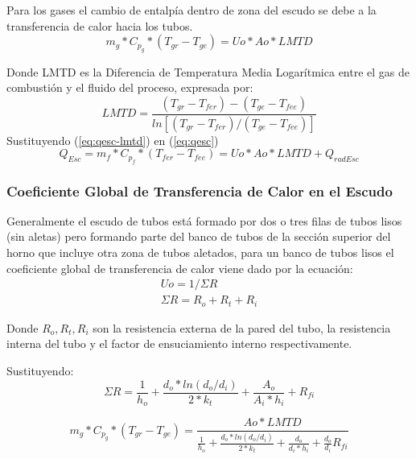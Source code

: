 \par Para los gases el cambio de entalpía dentro de zona del escudo se debe a la transferencia de calor hacia los tubos.
\begin{equation}
\label{eq:qesc-lmtd}
m_{g} *C_{p_g} *(T_{gr} -T_{ge}) = Uo *Ao *LMTD
\end{equation}

\par Donde LMTD es la Diferencia de Temperatura Media Logarítmica entre el gas de combustión y el fluido del proceso, expresada por:
\begin{equation}
\label{eq:lmtd}
   LMTD = \frac{(T_{gr}-T_{fer}) - (T_{ge}-T_{fee})}
   {ln[(T_{gr}-T_{fer}) /(T_{ge}-T_{fee})]}
\end{equation}
Sustituyendo (\ref{eq:qesc-lmtd}) en (\ref{eq:qesc})
\begin{equation}
\label{eq:tesc}
  Q_{Esc} = m_{f} *C_{p_f} *(T_{fer} - T_{fee}) = Uo *Ao *LMTD + Q_{radEsc}
\end{equation}

\subsubsection{Coeficiente Global de Transferencia de Calor en el Escudo}

\par Generalmente el escudo de tubos está formado por dos o tres filas de tubos lisos (sin aletas) pero formando parte del banco de tubos de la sección superior del horno que incluye otra zona de tubos aletados, para un banco de tubos lisos el coeficiente global de transferencia de calor viene dado por la ecuación:
\begin{gather*}
\label{}
Uo  = 1 / \Sigma R \\
\Sigma R = R_o + R_t + R_i
\end{gather*}

\par Donde $R_o, R_t, R_i$ son la resistencia externa de la pared del tubo, la resistencia interna del tubo y el factor de ensuciamiento interno respectivamente.
\par Sustituyendo:
\begin{equation}
\label{}
\Sigma R = \frac{1}{h_o} +\frac{d_o*ln(d_o/d_i)}{2*k_t} +\frac{A_o}{A_i*h_i} +R_{fi}
\end{equation}

\begin{equation}
\label{}
m_{g} *C_{p_g} *(T_{gr} - T_{ge}) = \frac{Ao *LMTD}
{\frac{1}{h_o} +\frac{d_o*ln(d_o/d_i)}{2*k_t} +\frac{d_o}{d_i*h_i} +\frac{d_o}{d_i}R_{fi}}
\end{equation}

